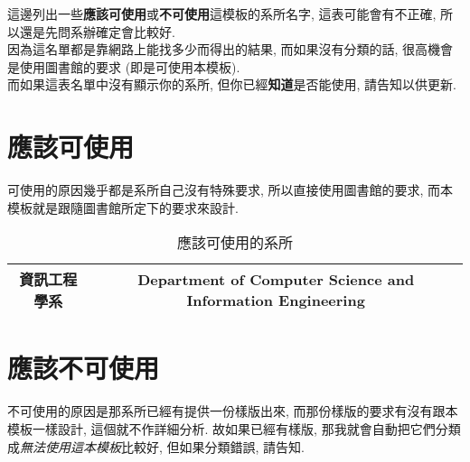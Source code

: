 
這邊列出一些\textbf{應該可使用}或\textbf{不可使用}這模板的系所名字, 這表可能會有不正確, 所以還是先問系辦確定會比較好. \\

因為這名單都是靠網路上能找多少而得出的結果, 而如果沒有分類的話, 很高機會是使用圖書館的要求 (即是可使用本模板). \\

而如果這表名單中沒有顯示你的系所, 但你已經\textbf{知道}是否能使用, 請告知以供更新.

\clearpage

\section{應該可使用}

  可使用的原因幾乎都是系所自己沒有特殊要求, 所以直接使用圖書館的要求, 而本模板就是跟隨圖書館所定下的要求來設計.

  \begin{table*}[pht]
    \centering
    \caption{應該可使用的系所}
    \label{table:acceptable-dept:acceptable}
    \begin{tabular}{|c|c|}

    \hline
    \multicolumn{1}{|c|}{資訊工程學系} &
    \multicolumn{1}{c|}{Department of Computer Science and Information Engineering} \\

    \hline
    \end{tabular}
  \end{table*}

\section{應該不可使用}

  不可使用的原因是那系所已經有提供一份樣版出來, 而那份樣版的要求有沒有跟本模板一樣設計, 這個就不作詳細分析. 故如果已經有樣版, 那我就會自動把它們分類成\textit{無法使用這本模板}比較好, 但如果分類錯誤, 請告知.

